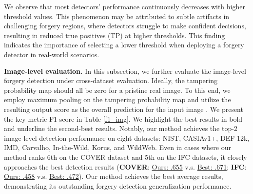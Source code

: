 \documentclass[10pt,journal,compsoc]{IEEEtran}
\begin{document}
We observe that most detectors' performance continuously decreases with higher threshold values. This phenomenon may be attributed to subtle artifacts in challenging forgery regions, where detectors struggle to make confident decisions, resulting in reduced true positives (TP) at higher thresholds. This finding indicates the importance of selecting a lower threshold when deploying a forgery detector in real-world scenarios.

\noindent\textbf{Image-level evaluation.}
In this subsection, we further evaluate the image-level forgery detection under cross-dataset evaluation. Ideally, the tampering probability map should all be zero for a pristine real image. To this end, we employ maximum pooling on the tampering probability map and utilize the resulting output score as the overall prediction for the input image \cite{rao2022towards}. We present the key metric F1 score in Table \ref{f1_img}. We highlight the best results in bold and underline the second-best results. Notably, our method achieves the top-2 image-level detection performance on eight datasets: NIST, CASIAv1+, DEF-12k, IMD, Carvalho, In-the-Wild, Korus, and WildWeb. Even in cases where our method ranks 6th on the COVER dataset and 5th on the IFC datasets, it closely approaches the best detection results (\textbf{COVER}: \underline{Ours: .655} v.s. \underline{Best: .671}; \textbf{IFC}: \underline{Ours: .458} v.s. \underline{Best: .472}). Our method achieves the best average results, demonstrating its outstanding forgery detection generalization performance. 

\end{document}
